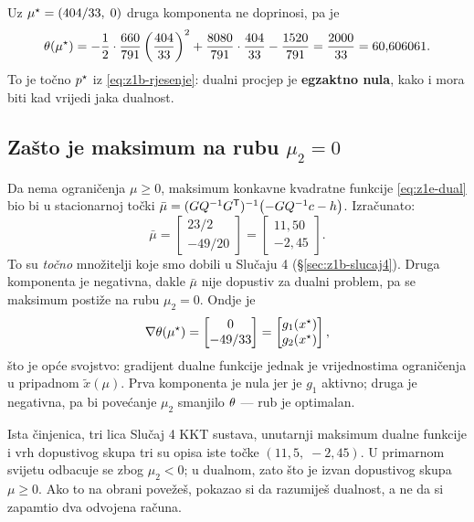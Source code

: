 \begin{korak}[Provjera: $\dual(\muopt) = \popt$]
Uz $\mu^{\star} = (404/33,\; 0)$ druga komponenta ne doprinosi, pa je
\[
\theta(\mu^{\star}) = -\frac12 \cdot \frac{660}{791}\left(\frac{404}{33}\right)^{2}
+ \frac{8080}{791}\cdot\frac{404}{33} - \frac{1520}{791}
= \frac{2000}{33} = 60{,}606061 .
\]
To je točno $p^{\star}$ iz \eqref{eq:z1b-rjesenje}: dualni procjep je \textbf{egzaktno
nula}, kako i mora biti kad vrijedi jaka dualnost.
\end{korak}

\subsection{Zašto je maksimum na rubu $\mu_2 = 0$}

\begin{korak}
Da nema ograničenja $\mu \geq 0$, maksimum konkavne kvadratne funkcije
\eqref{eq:z1e-dual} bio bi u stacionarnoj točki
$\bar{\mu} = (GQ^{-1}G^{\mathsf{T}})^{-1}\bigl(-GQ^{-1}c - h\bigr)$. Izračunato:
\begin{equation}
\bar{\mu} = \begin{bmatrix} 23/2 \\ -49/20 \end{bmatrix}
          = \begin{bmatrix} 11{,}50 \\ -2{,}45 \end{bmatrix}.
\end{equation}
To su \emph{točno} množitelji koje smo dobili u Slučaju 4
(\S\ref{sec:z1b-slucaj4}). Druga komponenta je negativna, dakle
$\bar{\mu}$ nije dopustiv za dualni problem, pa se maksimum postiže na rubu
$\mu_2 = 0$. Ondje je
\begin{equation}
\nabla \theta(\mu^{\star}) = \begin{bmatrix} 0 \\ -49/33 \end{bmatrix}
                     = \begin{bmatrix} g_1(x^{\star}) \\ g_2(x^{\star}) \end{bmatrix},
\end{equation}
što je opće svojstvo: gradijent dualne funkcije jednak je vrijednostima
ograničenja u pripadnom $\tilde{x}(\mu)$. Prva komponenta je nula jer je $g_1$
aktivno; druga je negativna, pa bi povećanje $\mu_2$ smanjilo $\theta$ --- rub je
optimalan.
\end{korak}

\begin{pojam}{Ista činjenica, tri lica}
Slučaj 4 KKT sustava, unutarnji maksimum dualne funkcije i vrh dopustivog skupa
tri su opisa iste točke $(11{,}5,\; -2{,}45)$. U primarnom svijetu odbacuje se
zbog $\mu_2 < 0$; u dualnom, zato što je izvan dopustivog skupa $\mu \geq 0$.
Ako to na obrani povežeš, pokazao si da razumiješ dualnost, a ne da si zapamtio
dva odvojena računa.
\end{pojam}

